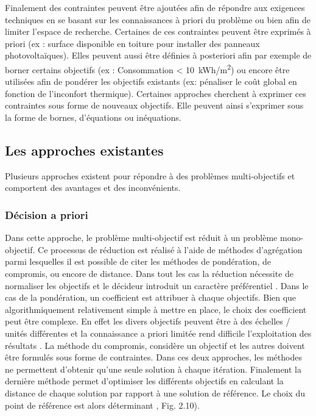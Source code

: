Finalement des contraintes peuvent être ajoutées afin de répondre aux exigences
techniques en se basant sur les connaissances à priori du problème ou bien afin de
limiter l’espace de recherche.
Certaines de ces contraintes peuvent être exprimés à priori (ex : surface disponible
en toiture pour installer des panneaux photovoltaïques). Elles peuvent aussi être définies
à posteriori afin par exemple de borner certains objectifs (ex : Consommation < 10~\si{kWh/m^{2}})
ou encore être utilisées afin de pondérer les objectifs existants (ex: pénaliser le coût global en fonction de l’inconfort
thermique). Certaines approches cherchent à exprimer ces contraintes sous forme de
nouveaux objectifs.
Elle peuvent ainsi s’exprimer sous la forme de bornes, d’équations ou inéquations.

\subsection{Les approches existantes} %
\label{sub:les_approches_existantes}
Plusieurs approches existent pour répondre à des problèmes multi-objectifs et
comportent des avantages et des inconvénients.

\subsubsection{Décision a priori} %
\label{ssub:decision_a_priori}
Dans cette approche, le problème multi-objectif est réduit à un problème mono-objectif.
Ce processus de réduction est réalisé à l’aide de méthodes d’agrégation parmi lesquelles
il est possible de citer les méthodes de pondération, de compromis,
ou encore de distance. Dans tout les cas la réduction nécessite de normaliser les
objectifs et le décideur introduit un caractère préférentiel \parencite{Rivallain2013,Armand-Decker2015}.
Dans le cas de la pondération, un coefficient est attribuer à chaque objectifs. Bien que
algorithmiquement relativement simple à mettre en place, le choix des coefficient peut être complexe.
En effet les divers objectifs peuvent être à des échelles / unités différentes
et la connaissance a priori limitée rend difficile l’exploitation des résultats .
La méthode du compromis, considère un objectif et les autres doivent être formulés
sous forme de contraintes.
Dans ces deux approches, les méthodes ne permettent d’obtenir qu’une seule
solution à chaque itération.
Finalement la dernière méthode permet d’optimiser les différents objectifs en calculant
la distance de chaque solution par rapport à une solution de référence. Le choix
du point de référence est alors déterminant \parencite{Collette2002}, Fig. 2.10).

